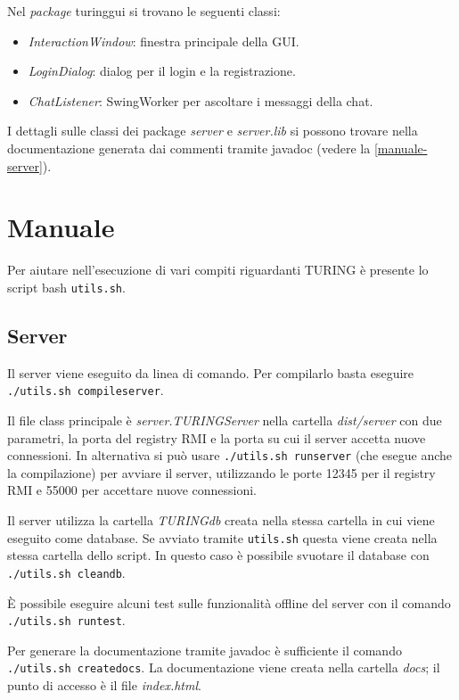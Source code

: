 \documentclass[a4paper]{article}
\theoremstyle{theorem}
\theoremstyle{remark}
\theoremstyle{definition}
\theoremstyle{corollary}
\theoremstyle{lemma}
\begin{document}
Nel \textit{package} turinggui si trovano le seguenti classi:
\begin{itemize}
	\item \textit{InteractionWindow}: finestra principale della GUI.
	\item \textit{LoginDialog}: dialog per il login e la registrazione.
	\item \textit{ChatListener}: SwingWorker per ascoltare i messaggi della chat.
\end{itemize}

I dettagli sulle classi dei package \textit{server} e \textit{server.lib} si possono trovare nella documentazione generata dai commenti tramite javadoc (vedere la \autoref{manuale-server}).

\section{Manuale}
Per aiutare nell'esecuzione di vari compiti riguardanti TURING è presente lo script bash \texttt{utils.sh}.

\subsection{Server}\label{manuale-server}
Il server viene eseguito da linea di comando. Per compilarlo basta eseguire \texttt{./utils.sh compileserver}.

Il file class principale è \textit{server.TURINGServer} nella cartella \textit{dist/server} con due parametri, la porta del registry RMI e la porta su cui il server accetta nuove connessioni.
In alternativa si può usare \texttt{./utils.sh runserver} (che esegue anche la compilazione) per avviare il server, utilizzando le porte 12345 per il registry RMI e 55000 per accettare nuove connessioni.

Il server utilizza la cartella \textit{TURINGdb} creata nella stessa cartella in cui viene eseguito come database. Se avviato tramite \texttt{utils.sh} questa viene creata nella stessa cartella dello script. In questo caso è possibile svuotare il database con \texttt{./utils.sh cleandb}.

È possibile eseguire alcuni test sulle funzionalità offline del server con il comando \texttt{./utils.sh runtest}.

Per generare la documentazione tramite javadoc è sufficiente il comando \texttt{./utils.sh createdocs}. La documentazione viene creata nella cartella \textit{docs}; il punto di accesso è il file \textit{index.html}.
\end{document}
